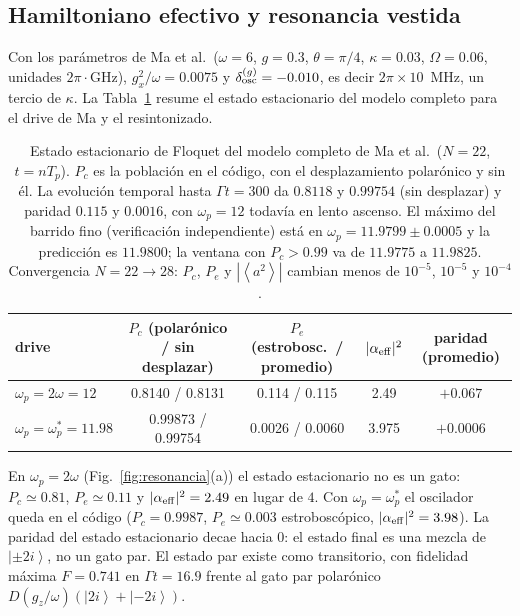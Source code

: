 \documentclass[11pt,a4paper]{article}
\newcommand{\ket}[1]{\left|#1\right\rangle}
\newcommand{\ave}[1]{\left\langle#1\right\rangle}
\newcommand{\wps}{\omega_p^{*}}
\theoremstyle{definition}
\begin{document}
\subsection{Hamiltoniano efectivo y resonancia vestida}
\label{sec:res_res}

Con los parámetros de Ma et al.\ ($\omega=6$, $g=0.3$, $\theta=\pi/4$, $\kappa=0.03$, $\Omega=0.06$, unidades $2\pi\cdot$GHz), $g_x^2/\omega=0.0075$ y $\delta_{\rm osc}^{(g)}=-0.010$, es decir $2\pi\times10$~MHz, un tercio de $\kappa$. La Tabla~\ref{tab:res} resume el estado estacionario del modelo completo para el drive de Ma y el resintonizado.

\begin{table}[h]
\centering
\begin{tabular}{lcccc}
\toprule
drive & $P_c$ (polarónico / sin desplazar) & $P_e$ (estrobosc.\ / promedio) & $|\alpha_{\rm eff}|^2$ & paridad (promedio)\\
\midrule
$\omega_p=2\omega=12$ & 0.8140 / 0.8131 & 0.114 / 0.115 & 2.49 & $+0.067$\\
$\omega_p=\wps=11.98$ & 0.99873 / 0.99754 & 0.0026 / 0.0060 & 3.975 & $+0.0006$\\
\bottomrule
\end{tabular}
\caption{Estado estacionario de Floquet del modelo completo de Ma et al.\ ($N=22$, $t=nT_p$). $P_c$ es la población en el código, con el desplazamiento polarónico y sin él. La evolución temporal hasta $\Gamma t=300$ da $0.8118$ y $0.99754$ (sin desplazar) y paridad $0.115$ y $0.0016$, con $\omega_p=12$ todavía en lento ascenso. El máximo del barrido fino (verificación independiente) está en $\omega_p=11.9799\pm0.0005$ y la predicción es $11.9800$; la ventana con $P_c>0.99$ va de $11.9775$ a $11.9825$. Convergencia $N=22\to28$: $P_c$, $P_e$ y $|\ave{a^2}|$ cambian menos de $10^{-5}$, $10^{-5}$ y $10^{-4}$.}
\label{tab:res}
\end{table}

En $\omega_p=2\omega$ (Fig.~\ref{fig:resonancia}(a)) el estado estacionario no es un gato: $P_c\simeq0.81$, $P_e\simeq0.11$ y $|\alpha_{\rm eff}|^2=2.49$ en lugar de $4$. Con $\omega_p=\wps$ el oscilador queda en el código ($P_c=0.9987$, $P_e\simeq0.003$ estroboscópico, $|\alpha_{\rm eff}|^2=3.98$). La paridad del estado estacionario decae hacia $0$: el estado final es una mezcla de $\ket{\pm2i}$, no un gato par. El estado par existe como transitorio, con fidelidad máxima $F=0.741$ en $\Gamma t=16.9$ frente al gato par polarónico $D(g_z/\omega)(\ket{2i}+\ket{-2i})$.
\end{document}
